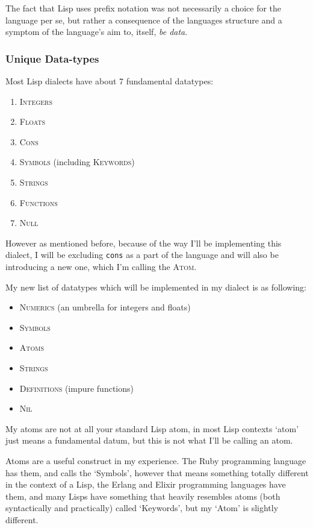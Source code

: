 \documentclass{article}
\newcommand{\code}[1]{\texttt{#1}}
\begin{document}
    The fact that Lisp uses prefix notation was not necessarily a choice for
    the language per se, but rather a consequence of the languages structure and
    a symptom of the language's aim to, itself, \emph{be data}.

    \subsubsection{Unique Data-types}
      Most Lisp dialects have about 7 fundamental datatypes:
      \begin{enumerate}
        \item \textsc{Integers}
        \item \textsc{Floats}
        \item \textsc{Cons}
        \item \textsc{Symbols} (including \textsc{Keywords})
        \item \textsc{Strings}
        \item \textsc{Functions}
        \item \textsc{Null}
      \end{enumerate}

      However as mentioned before, because of the way I'll be implementing this
      dialect, I will be excluding \code{cons} as a part of the language and will
      also be introducing a new one, which I'm calling the \textsc{Atom}.

      My new list of datatypes which will be implemented in my dialect is as
      following:

      \begin{itemize}
        \item \textsc{Numerics} (an umbrella for integers and floats)
        \item \textsc{Symbols}
        \item \textsc{Atoms}
        \item \textsc{Strings}
        \item \textsc{Definitions} (impure functions)
        \item \textsc{Nil}
      \end{itemize}

      My atoms are not at all your standard Lisp atom, in most Lisp contexts
      `atom' just means a fundamental datum, but this is not what I'll be
      calling an atom.

      Atoms are a useful construct in my experience. The Ruby programming language
      has them, and calls the `Symbols', however that means something totally
      different in the context of a Lisp, the Erlang and Elixir programming
      languages have them, and many Lisps have something that heavily resembles
      atoms (both syntactically and practically) called `Keywords', but my `Atom'
      is slightly different.
\end{document}
